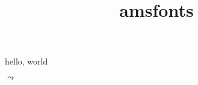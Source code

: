 \documentclass{amsart}
\title{amsfonts}
\begin{document}
\maketitle

hello, world

$\leadsto$
\end{document}
